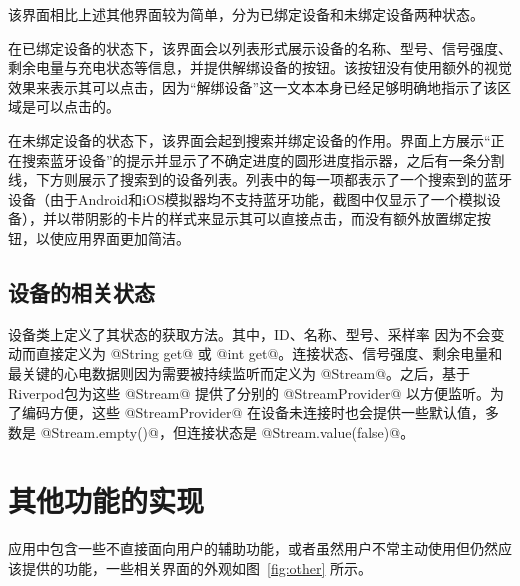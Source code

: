 该界面相比上述其他界面较为简单，分为已绑定设备和未绑定设备两种状态。

在已绑定设备的状态下，该界面会以列表形式展示设备的名称、型号、信号强度、剩余电量与充电状态等信息，并提供解绑设备的按钮。该按钮没有使用额外的视觉效果来表示其可以点击，因为“解绑设备”这一文本本身已经足够明确地指示了该区域是可以点击的。

在未绑定设备的状态下，该界面会起到搜索并绑定设备的作用。界面上方展示“正在搜索蓝牙设备”的提示并显示了不确定进度的圆形进度指示器，之后有一条分割线，下方则展示了搜索到的设备列表。列表中的每一项都表示了一个搜索到的蓝牙设备（由于Android和iOS模拟器均不支持蓝牙功能，截图中仅显示了一个模拟设备），并以带阴影的卡片的样式来显示其可以直接点击，而没有额外放置绑定按钮，以使应用界面更加简洁。

\subsection{设备的相关状态}\label{subsec:device}

设备类上定义了其状态的获取方法。其中，ID、名称、型号、采样率 因为不会变动而直接定义为 @String get@ 或 @int get@。连接状态、信号强度、剩余电量和最关键的心电数据则因为需要被持续监听而定义为 @Stream@。之后，基于Riverpod包为这些 @Stream@ 提供了分别的 @StreamProvider@ 以方便监听。为了编码方便，这些 @StreamProvider@ 在设备未连接时也会提供一些默认值，多数是 @Stream.empty()@，但连接状态是 @Stream.value(false)@。


\section{其他功能的实现}\label{sec:other}

应用中包含一些不直接面向用户的辅助功能，或者虽然用户不常主动使用但仍然应该提供的功能，一些相关界面的外观如图~\ref{fig:other} 所示。

